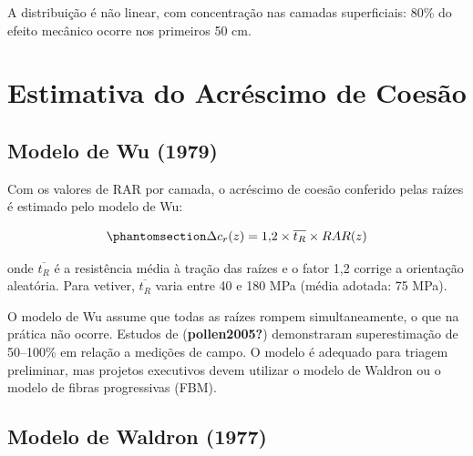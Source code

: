 \documentclass[
  portuguese,
  11pt,
  a4paper,
  open=any]{scrbook}
\begin{document}
A distribuição é não linear, com concentração nas camadas superficiais:
80\% do efeito mecânico ocorre nos primeiros 50 cm.

\section{Estimativa do Acréscimo de
Coesão}\label{estimativa-do-acruxe9scimo-de-coesuxe3o}

\subsection{Modelo de Wu (1979)}\label{modelo-de-wu-1979}

Com os valores de RAR por camada, o acréscimo de coesão conferido pelas
raízes é estimado pelo modelo de Wu:

\begin{equation}\phantomsection\label{eq-wu-cap22}{\Delta c_r(z) = 1{,}2 \times \overline{t_R} \times RAR(z)}\end{equation}

onde \(\overline{t_R}\) é a resistência média à tração das raízes e o
fator 1,2 corrige a orientação aleatória. Para vetiver,
\(\overline{t_R}\) varia entre 40 e 180 MPa (média adotada: 75 MPa).

\begin{tcolorbox}[enhanced jigsaw, leftrule=.75mm, colframe=quarto-callout-important-color-frame, colback=white, bottomrule=.15mm, opacityback=0, colbacktitle=quarto-callout-important-color!10!white, breakable, bottomtitle=1mm, opacitybacktitle=0.6, title=\textcolor{quarto-callout-important-color}{\faExclamation}\hspace{0.5em}{Limitação do Modelo de Wu}, titlerule=0mm, toprule=.15mm, toptitle=1mm, rightrule=.15mm, left=2mm, arc=.35mm, coltitle=black]

O modelo de Wu assume que todas as raízes rompem simultaneamente, o que
na prática não ocorre. Estudos de (\textbf{pollen2005?}) demonstraram
superestimação de 50--100\% em relação a medições de campo. O modelo é
adequado para triagem preliminar, mas projetos executivos devem utilizar
o modelo de Waldron ou o modelo de fibras progressivas (FBM).

\end{tcolorbox}

\subsection{Modelo de Waldron (1977)}\label{modelo-de-waldron-1977}
\end{document}
